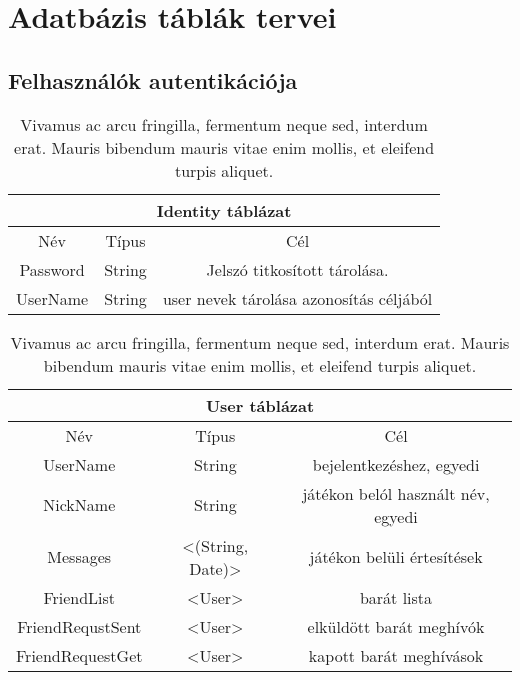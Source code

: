 \chapter{Adatbázis táblák tervei} %
\label{ch:databases_plan}

\section{Felhasználók autentikációja}

\begin{table}[htb]
	\centering
	\begin{tabular}{ |c|c|c| }
		\hline
		\multicolumn{3}{|c|}{Identity táblázat}\\
		\hline
		Név & Típus & Cél \\
		\hline
		Password  & String  & Jelszó titkosított tárolása.  \\
		\hline
		UserName & String & user nevek tárolása azonosítás céljából\\
		\hline
	\end{tabular}
	\caption[Rövid cím a táblázatjegyzékbe]{Vivamus ac arcu fringilla, fermentum neque sed, interdum erat. Mauris bibendum mauris vitae enim mollis, et eleifend turpis aliquet.}
	\label{tab:example-2}
\end{table}


\begin{table}[htb]
	\centering
	\begin{tabular}{ |c|c|c| }
		\hline
		\multicolumn{3}{|c|}{User táblázat}\\
		\hline
		Név & Típus & Cél \\
		\hline
		UserName  & String  & bejelentkezéshez, egyedi  \\
		\hline
		NickName & String & játékon belól használt név, egyedi\\
		\hline
		Messages & <(String, Date)> & játékon belüli értesítések\\
		\hline
		FriendList & <User> & barát lista\\
		\hline
		FriendRequstSent & <User> & elküldött barát meghívók\\
		\hline
		FriendRequestGet & <User> & kapott barát meghívások \\
		\hline
	\end{tabular}
	\caption[Rövid cím a táblázatjegyzékbe]{Vivamus ac arcu fringilla, fermentum neque sed, interdum erat. Mauris bibendum mauris vitae enim mollis, et eleifend turpis aliquet.}
	\label{tab:example-2}
\end{table}

